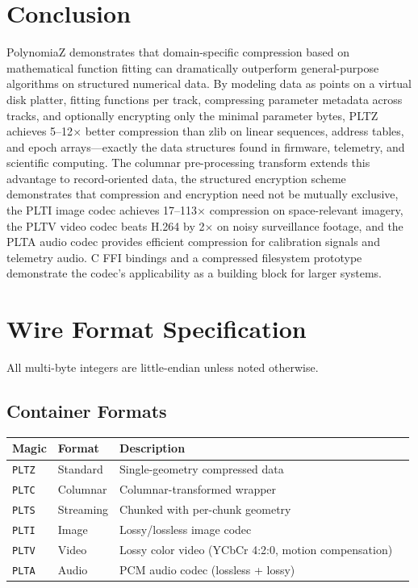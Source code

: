 \documentclass[11pt,a4paper]{article}
\begin{document}
\section{Conclusion}

PolynomiaZ demonstrates that domain-specific compression based on mathematical function fitting can dramatically outperform general-purpose algorithms on structured numerical data. By modeling data as points on a virtual disk platter, fitting functions per track, compressing parameter metadata across tracks, and optionally encrypting only the minimal parameter bytes, PLTZ achieves 5--12$\times$ better compression than zlib on linear sequences, address tables, and epoch arrays---exactly the data structures found in firmware, telemetry, and scientific computing. The columnar pre-processing transform extends this advantage to record-oriented data, the structured encryption scheme demonstrates that compression and encryption need not be mutually exclusive, the PLTI image codec achieves 17--113$\times$ compression on space-relevant imagery, the PLTV video codec beats H.264 by 2$\times$ on noisy surveillance footage, and the PLTA audio codec provides efficient compression for calibration signals and telemetry audio. C FFI bindings and a compressed filesystem prototype demonstrate the codec's applicability as a building block for larger systems.

\appendix

\section{Wire Format Specification}
\label{app:wireformat}

All multi-byte integers are little-endian unless noted otherwise.

\subsection{Container Formats}

\begin{table}[H]
\centering
\small
\begin{tabular}{@{}llll@{}}
\toprule
\textbf{Magic} & \textbf{Format} & \textbf{Description} \\
\midrule
\texttt{PLTZ} & Standard & Single-geometry compressed data \\
\texttt{PLTC} & Columnar & Columnar-transformed wrapper \\
\texttt{PLTS} & Streaming & Chunked with per-chunk geometry \\
\texttt{PLTI} & Image & Lossy/lossless image codec \\
\texttt{PLTV} & Video & Lossy color video (YCbCr 4:2:0, motion compensation) \\
\texttt{PLTA} & Audio & PCM audio codec (lossless + lossy) \\
\bottomrule
\end{tabular}
\end{table}
\end{document}
